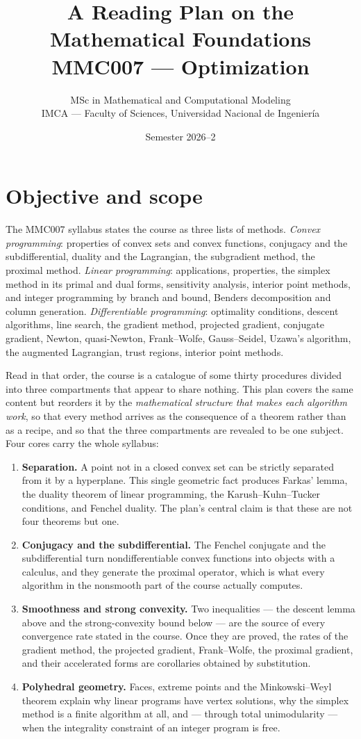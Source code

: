 \documentclass[11pt,a4paper]{article}
\title{\textbf{A Reading Plan on the Mathematical Foundations}\\[3pt]
\large MMC007 --- Optimization}
\author{MSc in Mathematical and Computational Modeling\\
IMCA --- Faculty of Sciences, Universidad Nacional de Ingenier\'ia}
\date{Semester 2026--2}
\begin{document}
\maketitle

\section{Objective and scope}

The MMC007 syllabus states the course as three lists of methods. \emph{Convex
programming}: properties of convex sets and convex functions, conjugacy and the
subdifferential, duality and the Lagrangian, the subgradient method, the proximal method.
\emph{Linear programming}: applications, properties, the simplex method in its primal and
dual forms, sensitivity analysis, interior point methods, and integer programming by branch
and bound, Benders decomposition and column generation. \emph{Differentiable programming}:
optimality conditions, descent algorithms, line search, the gradient method, projected
gradient, conjugate gradient, Newton, quasi-Newton, Frank--Wolfe, Gauss--Seidel, Uzawa's
algorithm, the augmented Lagrangian, trust regions, interior point methods.

Read in that order, the course is a catalogue of some thirty procedures divided into three
compartments that appear to share nothing. This plan covers the same content but reorders it
by the \emph{mathematical structure that makes each algorithm work}, so that every method
arrives as the consequence of a theorem rather than as a recipe, and so that the three
compartments are revealed to be one subject. Four cores carry the whole syllabus:

\begin{enumerate}
\item \textbf{Separation.} A point not in a closed convex set can be strictly separated from
it by a hyperplane. This single geometric fact produces Farkas' lemma, the duality theorem of
linear programming, the Karush--Kuhn--Tucker conditions, and Fenchel duality. The plan's
central claim is that these are not four theorems but one.
\item \textbf{Conjugacy and the subdifferential.} The Fenchel conjugate and the
subdifferential turn nondifferentiable convex functions into objects with a calculus, and
they generate the proximal operator, which is what every algorithm in the nonsmooth part of
the course actually computes.
\item \textbf{Smoothness and strong convexity.} Two inequalities --- the descent lemma above
and the strong-convexity bound below --- are the source of every convergence rate stated in
the course. Once they are proved, the rates of the gradient method, the projected gradient,
Frank--Wolfe, the proximal gradient, and their accelerated forms are corollaries obtained by
substitution.
\item \textbf{Polyhedral geometry.} Faces, extreme points and the Minkowski--Weyl theorem
explain why linear programs have vertex solutions, why the simplex method is a finite
algorithm at all, and --- through total unimodularity --- when the integrality constraint of
an integer program is free.
\end{enumerate}
\end{document}
